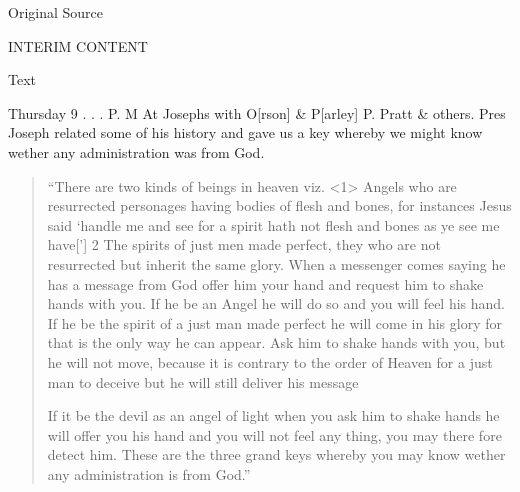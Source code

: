				
				\begin{description}
					\item[Original Source]
				\end{description}
				
					INTERIM CONTENT
				
				
				\begin{description}
					\item[Text]
				\end{description}
				
					Thursday 9 . . . P. M At Josephs with O[rson] \& P[arley] P. Pratt \& others. Pres Joseph related some of his history and gave us a key whereby we might know wether any administration was from God.

					\begin{quote}
						``There are two kinds of beings in heaven viz. <1> Angels who are resurrected personages having bodies of flesh and bones, for instances Jesus said `handle me and see for a spirit hath not flesh and bones as ye see me have['] 2 The spirits of just men made perfect, they who are not resurrected but inherit the same glory. When a messenger comes saying he has a message from God offer him your hand and request him to shake hands with you. If he be an Angel he will do so and you will feel his hand. If he be the spirit of a just man made perfect he will come in his glory for that is the only way he can appear. Ask him to shake hands with you, but he will not move, because it is contrary to the order of Heaven for a just man to deceive but he will still deliver his message

						If it be the devil as an angel of light when you ask him to shake hands he will offer you his hand and you will not feel any thing, you may there fore detect him. These are the three grand keys whereby you may know wether any administration is from God.''
					\end{quote}

